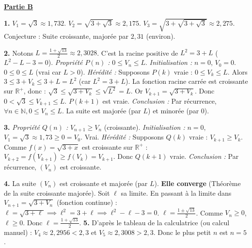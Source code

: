 \documentclass[11pt]{article}
\begin{document}
\begin{exoresolu}
\underline{\textbf{Partie B}}\par
\textbf{1.} $V_1 = \sqrt{3} \approx 1,732$. $V_2 = \sqrt{3+\sqrt{3}} \approx 2,175$. $V_3 = \sqrt{3+\sqrt{3+\sqrt{3}}} \approx 2,275$.
Conjecture : Suite croissante, majorée par $2,31$ (environ).\par
\textbf{2.} Notons $L = \frac{1+\sqrt{13}}{2} \approx 2,3028$. C'est la racine positive de $L^2 = 3+L$ ($L^2-L-3=0$).
\emph{Propriété $P(n)$ :} $0 \le V_n \le L$.
\textit{Initialisation :} $n=0$, $V_0=0$. $0 \le 0 \le L$ (vrai car $L>0$).
\textit{Hérédité :} Supposons $P(k)$ vraie : $0 \le V_k \le L$.
Alors $3 \le 3+V_k \le 3+L = L^2$ (car $L^2=3+L$).
La fonction racine carrée est croissante sur $\mathbb{R}^+$, donc :
$\sqrt{3} \le \sqrt{3+V_k} \le \sqrt{L^2} = L$.
Or $V_{k+1} = \sqrt{3+V_k}$. Donc $0 < \sqrt{3} \le V_{k+1} \le L$.
$P(k+1)$ est vraie.
\textit{Conclusion :} Par récurrence, $\forall n \in \mathbb{N}, 0 \le V_n \le L$. La suite est majorée (par $L$) et minorée (par $0$).\par
\textbf{3.} \emph{Propriété $Q(n)$ :} $V_{n+1} \ge V_n$ (croissante).
\textit{Initialisation :} $n=0$, $V_1 = \sqrt{3} \approx 1,73 \ge 0 = V_0$. Vrai.
\textit{Hérédité :} Supposons $Q(k)$ vraie : $V_{k+1} \ge V_k$.
Comme $f(x)=\sqrt{3+x}$ est croissante sur $\mathbb{R}^+$ :
$V_{k+2} = f(V_{k+1}) \ge f(V_k) = V_{k+1}$.
Donc $Q(k+1)$ vraie.
\textit{Conclusion :} Par récurrence, $(V_n)$ est croissante.\par
\textbf{4.} La suite $(V_n)$ est croissante et majorée (par $L$). \textbf{Elle converge} (Théorème de la suite croissante majorée).
Soit $\ell$ sa limite. En passant à la limite dans $V_{n+1} = \sqrt{3+V_n}$ (fonction continue) :
$\ell = \sqrt{3+\ell} \implies \ell^2 = 3+\ell \implies \ell^2 - \ell - 3 = 0$.
$\ell = \frac{1 \pm \sqrt{13}}{2}$. Comme $V_n \ge 0$, $\ell \ge 0$. Donc $\ell = \frac{1+\sqrt{13}}{2}$.
\textbf{5.} D'après le tableau de la calculatrice (ou calcul manuel) :
$V_4 \approx 2,2956 < 2,3$ et $V_5 \approx 2,3008 > 2,3$.
Donc le plus petit $n$ est \textbf{$n=5$}.


\end{exoresolu}
\end{document}
